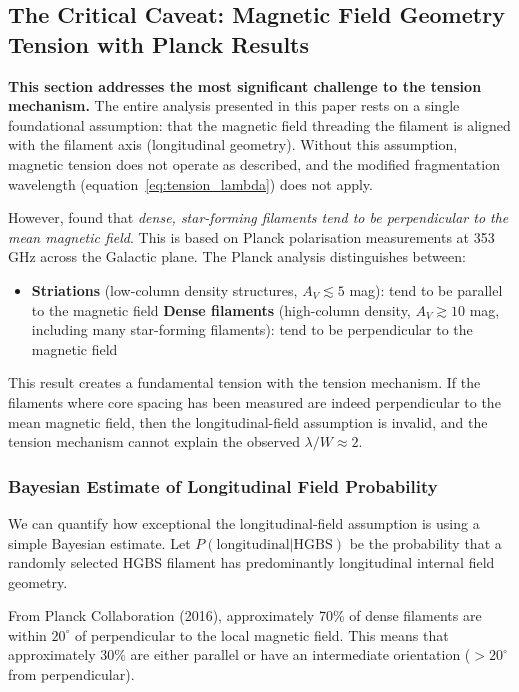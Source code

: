 \documentclass[11pt,a4paper]{article}
\begin{document}
\subsection{The Critical Caveat: Magnetic Field Geometry Tension with Planck Results}
\label{sec:planck_tension}

\textbf{This section addresses the most significant challenge to the tension mechanism.} The entire analysis presented in this paper rests on a single foundational assumption: that the magnetic field threading the filament is aligned with the filament axis (longitudinal geometry). Without this assumption, magnetic tension does not operate as described, and the modified fragmentation wavelength (equation~\ref{eq:tension_lambda}) does not apply.

However, \cite{Planck2016} found that \emph{dense, star-forming filaments tend to be perpendicular to the mean magnetic field}. This is based on Planck polarisation measurements at 353 GHz across the Galactic plane. The Planck analysis distinguishes between:
\begin{itemize}
    \item \textbf{Striations} (low-column density structures, $A_V \lesssim 5$ mag): tend to be parallel to the magnetic field
    \textbf{Dense filaments} (high-column density, $A_V \gtrsim 10$ mag, including many star-forming filaments): tend to be perpendicular to the magnetic field
\end{itemize}

This result creates a fundamental tension with the tension mechanism. If the filaments where core spacing has been measured are indeed perpendicular to the mean magnetic field, then the longitudinal-field assumption is invalid, and the tension mechanism cannot explain the observed $\lambda/W \approx 2$.

\subsubsection{Bayesian Estimate of Longitudinal Field Probability}

We can quantify how exceptional the longitudinal-field assumption is using a simple Bayesian estimate. Let $P(\text{longitudinal}|\text{HGBS})$ be the probability that a randomly selected HGBS filament has predominantly longitudinal internal field geometry.

From Planck Collaboration (2016), approximately 70\% of dense filaments are within $20^\circ$ of perpendicular to the local magnetic field. This means that approximately 30\% are either parallel or have an intermediate orientation ($>20^\circ$ from perpendicular).
\end{document}
